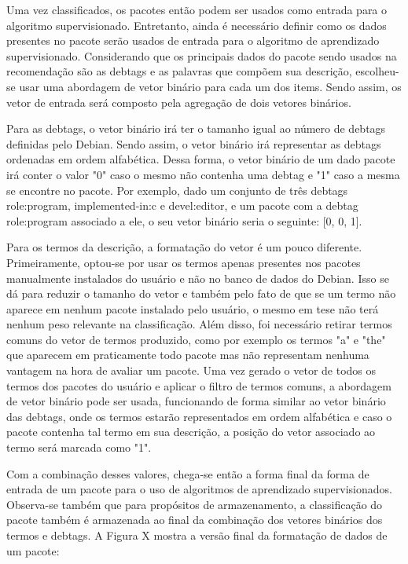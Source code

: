 Uma vez classificados, os pacotes então podem ser usados como entrada para o algoritmo supervisionado.
Entretanto, ainda é necessário definir como os dados presentes no pacote serão usados de entrada para o
algoritmo de aprendizado supervisionado. Considerando que os principais dados do pacote sendo usados na
recomendação são as debtags e as palavras que compõem sua descrição, escolheu-se usar uma abordagem de
vetor binário para cada um dos items. Sendo assim, os vetor de entrada será composto pela agregação de dois vetores
binários.

Para as debtags, o vetor binário irá ter o tamanho igual ao número de debtags definidas pelo Debian. Sendo assim, o
vetor binário irá representar as debtags ordenadas em ordem alfabética. Dessa forma,
o vetor binário de um dado pacote irá conter o valor "0" caso o mesmo não contenha uma debtag e "1" caso a mesma se encontre
no pacote. Por exemplo, dado um conjunto de três debtags role:program, implemented-in:c e devel:editor, e um pacote com a debtag
role:program associado a ele, o seu vetor binário seria o seguinte: [0, 0, 1].

Para os termos da descrição, a formatação do vetor é um pouco diferente. Primeiramente, optou-se por usar os termos apenas presentes
nos pacotes manualmente instalados do usuário e não no banco de dados do Debian. Isso se dá para reduzir o tamanho do vetor e também
pelo fato de que se um termo não aparece em nenhum pacote instalado pelo usuário, o mesmo em tese não terá nenhum peso relevante na
classificação. Além disso, foi necessário retirar termos comuns do vetor de termos produzido, como por exemplo os termos "a" e "the" que
aparecem em praticamente todo pacote mas não representam nenhuma vantagem na hora de avaliar um pacote. Uma vez gerado o vetor de todos os
termos dos pacotes do usuário e aplicar o filtro de termos comuns, a abordagem de vetor binário pode ser usada, funcionando de forma
similar ao vetor binário das debtags, onde os termos estarão representados em ordem alfabética e caso o pacote contenha tal termo em sua
descrição, a posição do vetor associado ao termo será marcada como "1".

Com a combinação desses valores, chega-se então a forma final da forma de entrada de um pacote para o uso de algoritmos de aprendizado
supervisionados. Observa-se também que para propósitos de  armazenamento, a classificação do pacote também é armazenada ao final da combinação
dos vetores binários dos termos e debtags. A Figura X mostra a versão final da formatação de dados de um pacote:

